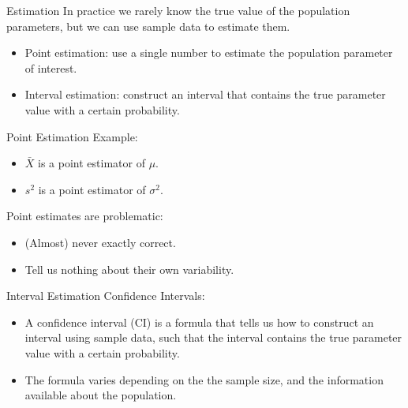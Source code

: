 \documentclass{beamer}
\begin{document}
\begin{frame}{Estimation}
    In practice we rarely know the true value of the population parameters, but we can use sample data to estimate them.
    \begin{itemize}
            \item Point estimation: use a single number to estimate the population parameter of interest.
            \item Interval estimation: construct an interval that contains the true parameter value with a certain probability.
    \end{itemize}
\end{frame}

\begin{frame}{Point Estimation}
    Example:
    \begin{itemize}
        \item  $\bar X$ is a point estimator of $\mu$.
        \item $s^2$ is a point estimator of $\sigma^2$.
    \end{itemize}

    Point estimates are problematic:
    \begin{itemize}
        \item (Almost) never exactly correct.
        \item Tell us nothing about their own variability.
    \end{itemize}
\end{frame}

\begin{frame}{Interval Estimation}
    Confidence Intervals:

    \begin{itemize}
    \item A \alert{confidence interval} (CI) is a formula that tells us how to construct an interval using sample data, 
        such that the interval contains the true parameter value with a certain probability.
    \item The formula varies depending on the the sample size, and the information available about the population.
    \end{itemize}
\end{frame}
\end{document}
